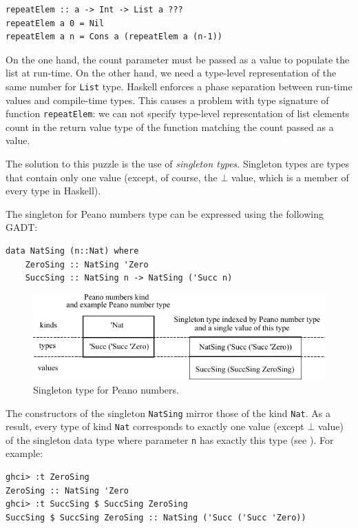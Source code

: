 \documentclass{tmr}
\newcommand{\italic}[1]{\textit{#1}}
\begin{document}
\begin{Verbatim}
repeatElem :: a -> Int -> List a ???
repeatElem a 0 = Nil
repeatElem a n = Cons a (repeatElem a (n-1))
\end{Verbatim}

On the one hand, the count parameter must be passed as a value to populate the list at run-time. On the other hand, we need a type-level representation of the same number for \verb|List| type. Haskell enforces a phase separation between run-time values and compile-time types. This causes a problem with type signature of function \verb|repeatElem|: we can not specify type-level representation of list elements count in the return value type of the function matching the count passed as a value.

The solution to this puzzle is the use of \italic{singleton types}. Singleton types are types that contain only one value (except, of course, the $\bot$ value, which is a member of every type in Haskell).

The singleton for Peano numbers type can be expressed using the following GADT:

\begin{Verbatim}
data NatSing (n::Nat) where
    ZeroSing :: NatSing 'Zero
    SuccSing :: NatSing n -> NatSing ('Succ n)
\end{Verbatim}

\begin{figure}
\centering
\includegraphics{singleton}
\vspace{5pt}
\caption{Singleton type for Peano numbers.}
\label{fig:singleton}
\end{figure}

The constructors of the singleton \verb|NatSing| mirror those of the kind \verb|Nat|. As a result, every type of kind \verb|Nat| corresponds to exactly one value (except $\bot$ value) of the singleton data type where parameter \verb|n| has exactly this type (see ). For example:

\begin{Verbatim}
ghci> :t ZeroSing
ZeroSing :: NatSing 'Zero
ghci> :t SuccSing $ SuccSing ZeroSing
SuccSing $ SuccSing ZeroSing :: NatSing ('Succ ('Succ 'Zero))
\end{Verbatim}
\end{document}
